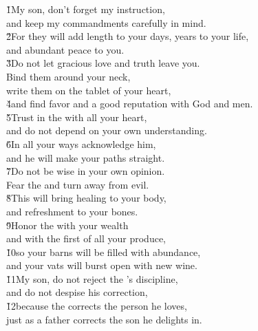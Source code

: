\begin{poetry}
\poeml {}
\v{1}My son, don't forget my instruction, \\
\poeml and keep my commandments carefully in mind. \\
\poeml \v{2}For they will add length to your days, years to your life, \\
\poemll    and abundant peace to you. \\
\poeml \v{3}Do not let gracious love and truth leave you. \\
\poemll    Bind them around your neck, \\
\poemlll       write them on the tablet of your heart, \\
\poeml \v{4}and find favor and a good reputation with God and men. \\
\poeml \v{5}Trust in the  with all your heart, \\
\poemll    and do not depend on your own understanding. \\
\poeml \v{6}In all your ways acknowledge him, \\
\poemll    and he will make your paths straight. \\
\poeml \v{7}Do not be wise in your own opinion. \\
\poemll    Fear the  and turn away from evil. \\
\poeml \v{8}This will bring healing to your body, \\
\poemll    and refreshment to your bones. \\
\poeml \v{9}Honor the  with your wealth \\
\poemll    and with the first of all your produce, \\
\poeml \v{10}so your barns will be filled with abundance, \\
\poemll    and your vats will burst open with new wine. \\
\poeml \v{11}My son, do not reject the 's discipline, \\
\poemll    and do not despise his correction, \\
\poeml \v{12}because the  corrects the person he loves, \\
\poemll    just as a father corrects the son he delights in.

\end{poetry}
